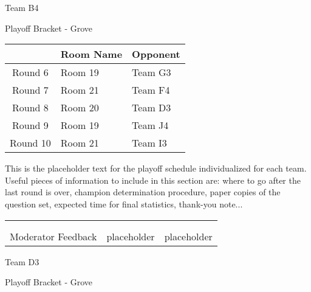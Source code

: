 \documentclass{article}%
\begin{document}
\newpage%
\begin{center}%
\begin{Huge}%
Team B4%
\end{Huge}%
\vspace*{12pt}%
\linebreak%
\begin{Large}%
Playoff Bracket {-} Grove%
\end{Large}%
\end{center}%
\vspace*{4pt}%
%
\begin{tabularx}{\textwidth}{|c|Y|Y|}%
\hline%
&Room Name&Opponent\\%
\hline%
Round 6&Room 19&Team G3\\%
Round 7&Room 21&Team F4\\%
Round 8&Room 20&Team D3\\%
Round 9&Room 19&Team J4\\%
Round 10&Room 21&Team I3\\%
\hline%
\end{tabularx}%
\vspace*{30pt}%
\linebreak%
This is the placeholder text for the playoff schedule individualized for each team. Useful pieces of information to include in this section are: where to go after the last round is over, champion determination procedure, paper copies of the question set, expected time for final statistics, thank{-}you note...%
\vspace*{30pt}%
\newline%
%
\begin{tabularx}{\textwidth}{YYY}%
  &  &  \\%
\\%
Moderator Feedback&placeholder&placeholder\\%
\end{tabularx}%
\newpage%
\begin{center}%
\begin{Huge}%
Team D3%
\end{Huge}%
\vspace*{12pt}%
\linebreak%
\begin{Large}%
Playoff Bracket {-} Grove%
\end{Large}%
\end{center}%
\end{document}
